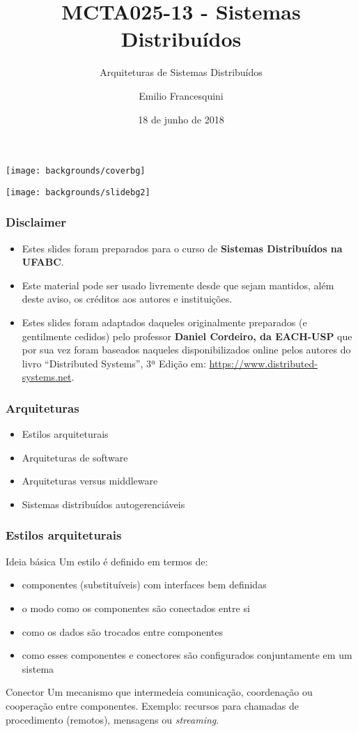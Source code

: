 \documentclass[Ligatures=TeX,table,brazil,svgnames,usetotalslideindicator,compress,10pt]{beamer}
\title{MCTA025-13 - Sistemas Distribuídos}
\subtitle{Arquiteturas de Sistemas Distribuídos}
\author{Emilio Francesquini}
\institute{Centro de Matemática, Computação e Cognição\\ Universidade Federal do ABC}
\date{18 de junho de 2018}
\newcommand{\setcoverbg}{
    \setbeamertemplate{background}
     {\texttt{[image: backgrounds/coverbg]}}
}
\newcommand{\setsectionbg}{
    \setbeamertemplate{background}
     {\texttt{[image: backgrounds/slidebg2]}}
}
\begin{document}
\setcoverbg
\maketitle

\setsectionbg

\begin{frame}
  \frametitle{Disclaimer}
  \begin{itemize}
  \item Estes slides foram preparados para o curso de \textbf{Sistemas
      Distribuídos na UFABC}.
  \item Este material pode ser usado livremente desde que sejam
    mantidos, além deste aviso, os créditos aos autores e
    instituições.
  \item Estes slides foram adaptados daqueles originalmente preparados
    (e gentilmente cedidos) pelo professor \textbf{Daniel Cordeiro, da
      EACH-USP} que por sua vez foram baseados naqueles
    disponibilizados online pelos autores do livro ``Distributed
    Systems'', 3ª Edição em:
    \url{https://www.distributed-systems.net}.
  \end{itemize}
\end{frame}

\begin{frame}
  \frametitle{Arquiteturas}
  \begin{itemize}
  \item Estilos arquiteturais
  \item Arquiteturas de software
  \item Arquiteturas versus middleware
  \item Sistemas distribuídos autogerenciáveis
  \end{itemize}
\end{frame}

\begin{frame}
  \frametitle{Estilos arquiteturais}
  \begin{block}{Ideia básica}
    Um estilo é definido em termos de:
    \begin{itemize}
    \item componentes (substituíveis) com interfaces bem definidas
    \item o modo como os componentes são conectados entre si
    \item como os dados são trocados entre componentes
    \item como esses componentes e conectores são configurados conjuntamente em um sistema
    \end{itemize}
  \end{block}

  \begin{block}{Conector}
    Um mecanismo que intermedeia comunicação, coordenação ou cooperação entre componentes. Exemplo: recursos para chamadas de procedimento (remotos), mensagens ou \textit{streaming}.
  \end{block}
\end{frame}
\end{document}
